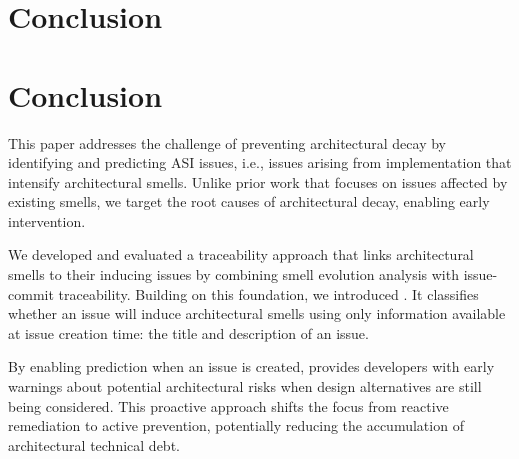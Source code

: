 \section{Conclusion}
\section{Conclusion}
\label{s:conclusion}

This paper addresses the challenge of preventing architectural decay by identifying and predicting \acl{ASI} issues, i.e., issues arising from implementation that intensify architectural smells.
Unlike prior work that focuses on issues affected by existing smells, we target the root causes of architectural decay, enabling early intervention.

We developed  and evaluated a traceability approach that links architectural smells to their inducing issues by combining smell evolution analysis with issue-commit traceability.
Building on this foundation, we introduced \approach. 
It classifies whether an issue will induce architectural smells using only information available at issue creation time: the title and description of an issue.

By enabling prediction when an issue is created, \approach provides developers with early warnings about potential architectural risks 
when design alternatives are still being considered.
This proactive approach shifts the focus from reactive remediation to active prevention, potentially reducing the accumulation of architectural technical debt.




